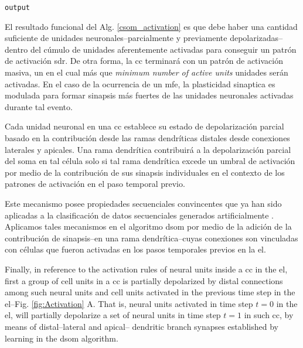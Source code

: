 {\begin{algorithm}
\begin{algorithmic}[1]
	\ENDIF

	\ENDFOR

	\RETURN \texttt{output}
\end{algorithmic}
\end{algorithm}

El resultado funcional del Alg. \ref{csom_activation} es que debe haber una cantidad suficiente de unidades neuronales--parcialmente y previamente depolarizadas--dentro del cúmulo de unidades aferentemente activadas para conseguir un patrón de activación \gls{sdr}. De otra forma, la \gls{cc} terminará con un patrón de activación masiva, un  en el cual más que \emph{minimum number of active units} unidades serán activadas.
En el caso de la ocurrencia de un \gls{mfe}, la plasticidad sinaptica es modulada para formar sinapsis más fuertes de las unidades neuronales activadas durante tal evento.

Cada unidad neuronal en una \gls{cc} establece su estado de depolarización parcial basado en la contribución desde
las ramas dendríticas distales desde conexiones laterales y apicales.
Una rama dendrítica contribuirá a la depolarización parcial del soma en tal célula solo si tal
rama dendrítica excede un umbral de activación por medio de la contribución de sus sinapsis individuales
en el contexto de los patrones de activación en el paso temporal previo.

Este mecanismo posee propiedades secuenciales convincentes \cite{hawkins_2016}
que ya han sido aplicadas a la clasificación de datos secuenciales generados artificialmente \cite{cui_2016}.
Aplicamos tales mecanismos en el algoritmo \gls{dsom} por medio de la adición de la contribución de sinapsis--en una rama dendrítica--cuyas conexiones
son vinculadas con células que fueron activadas en los pasos temporales previos en la \gls{el}.
}{
Finally, in reference to the activation rules of neural units inside a \gls{cc} in the \gls{el},
first a group of cell units in a \gls{cc} is partially depolarized 
by distal connections among such neural units and cell units activated in the
previous time step in the \gls{el}--Fig. \ref{fig:Activation} A.
That is, neural units activated in time step $t=0$ in the \gls{el}, will partially depolarize
a set of neural units in time step $t=1$ in such \gls{cc}, by means of distal--lateral and apical--
dendritic branch synapses established by learning in the \gls{dsom} algorithm.

}
